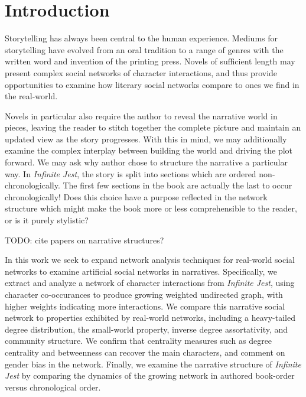 \documentclass[12pt]{article}
\newcommand{\infinitejest}{{\em Infinite Jest}\xspace}
\begin{document}
\maketitle

\section*{Introduction}

Storytelling has always been central to the human experience. Mediums for storytelling have evolved from an oral tradition to a range of genres with the written word and invention of the printing press. 
Novels of sufficient length may present complex social networks of character interactions, and thus provide opportunities to examine how literary social networks compare to ones we find in the real-world. 

Novels in particular also require the author to reveal the narrative world in pieces, leaving the reader to stitch together the complete picture and maintain an updated view as the story progresses. 
With this in mind, we may additionally examine the complex interplay between building the world and driving the plot forward. 
We may ask why author chose to structure the narrative a particular way. 
In \infinitejest, the story is split into sections which are ordered non-chronologically. 
The first few sections in the book are actually the last to occur chronologically!
Does this choice have a purpose reflected in the network structure which might make the book more or less comprehensible to the reader, or is it purely stylistic?

TODO: cite papers on narrative structures? 

In this work we seek to expand network analysis techniques for real-world social networks to examine artificial social networks in narratives.
Specifically, we extract and analyze a network of character interactions from \infinitejest, using character co-occurances to produce growing weighted undirected graph, with higher weights indicating more interactions.
We compare this narrative social network to properties exhibited by real-world networks, including a heavy-tailed degree distribution, the small-world property, inverse degree assortativity, and community structure. 
We confirm that centrality measures such as degree centrality and betweenness can recover the main characters, and comment on gender bias in the network.
Finally, we examine the narrative structure of \infinitejest by comparing the dynamics of the growing network in authored book-order versus chronological order.
\end{document}
